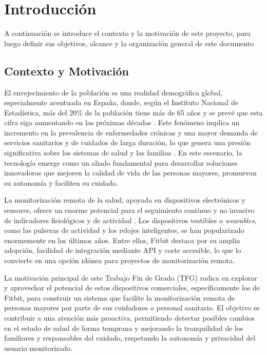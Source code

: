 \chapter{Introducción}
\label{chap:introduccion}
A continuación se introduce el contexto y la motivación de este proyecto, para luego definir sus objetivos, alcance y la organización general de este documento
\section{Contexto y Motivación}
\label{sec:intro_contexto}

El envejecimiento de la población es una realidad demográfica global, especialmente acentuada en España, donde, según el Instituto Nacional de Estadística, más del 20\% de la población tiene más de 65 años y se prevé que esta cifra siga aumentando en las próximas décadas \cite{ine_proyeccion_2022_2072}. Este fenómeno implica un incremento en la prevalencia de enfermedades crónicas y una mayor demanda de servicios sanitarios y de cuidados de larga duración, lo que genera una presión significativa sobre los sistemas de salud y las familias \cite{who_ageing_health}. En este escenario, la tecnología emerge como un aliado fundamental para desarrollar soluciones innovadoras que mejoren la calidad de vida de las personas mayores, promuevan su autonomía y faciliten su cuidado.

La monitorización remota de la salud, apoyada en dispositivos electrónicos y sensores, ofrece un enorme potencial para el seguimiento continuo y no invasivo de indicadores fisiológicos y de actividad \cite{majumder2017wearable}. Los dispositivos vestibles o \textit{wearables}, como las pulseras de actividad y los relojes inteligentes, se han popularizado enormemente en los últimos años. Entre ellos, Fitbit\textsuperscript{\textregistered} destaca por su amplia adopción, facilidad de integración mediante API y coste accesible, lo que lo convierte en una opción idónea para proyectos de monitorización remota.

La motivación principal de este Trabajo Fin de Grado (TFG) radica en explorar y aprovechar el potencial de estos dispositivos comerciales, específicamente los de Fitbit\textsuperscript{\textregistered}, para construir un sistema que facilite la monitorización remota de personas mayores por parte de sus cuidadores o personal sanitario. El objetivo es contribuir a una atención más proactiva, permitiendo detectar posibles cambios en el estado de salud de forma temprana y mejorando la tranquilidad de los familiares y responsables del cuidado, respetando la autonomía y privacidad del usuario monitorizado.


